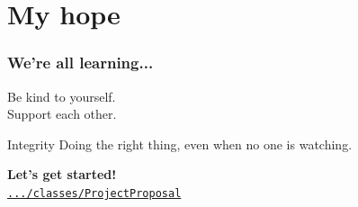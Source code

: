 \documentclass{beamer}
\begin{document}

\section{My hope}


\begin{frame}
    \frametitle{We're all learning...}

    \bigskip

    \begin{center}
        Be kind to yourself.\\
        Support each other.
    \end{center}

	\bigskip

    \begin{block}{Integrity}
      Doing the right thing, even when no one is watching.
    \end{block}

    \bigskip

    \begin{center}
    \textbf{Let's get started!}\\
        \texttt{\href{https://github.com/ScientificWriting/tree/master/classes/ProjectProposal}{.../classes/ProjectProposal}}
    \end{center}


\end{frame}
\end{document}
